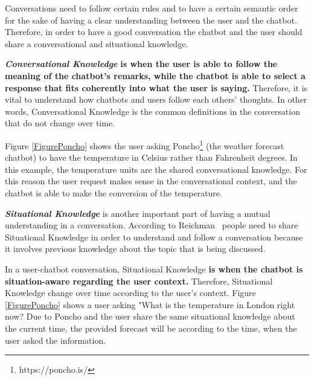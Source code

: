 \documentclass[a4paper,10pt]{article}
\begin{document}
Conversations need to follow certain rules and to have a certain semantic order for the sake of having a clear understanding between the user and the chatbot. Therefore, in order to have a good conversation the chatbot and the user should share a conversational and situational knowledge. 


\textbf{\textit{Conversational Knowledge}} \textbf{is when the user is able to follow the meaning of the chatbot's remarks, while the chatbot is able to select a response that fits coherently into what the user is saying.} Therefore, it is vital to understand how chatbots and users follow each others' thoughts. In other words, Conversational Knowledge is the common definitions in the conversation that do not change over time. 

Figure \ref{FigurePoncho} shows the user asking Poncho\footnote{https://poncho.is/} (the weather forecast chatbot) to have the temperature in Celsius rather than Fahrenheit degrees. In this example, the temperature units are the shared conversational knowledge. For this reason the user request makes sense in the conversational context, and the chatbot is able to make the conversion of the temperature.     


\textbf{\textit{Situational Knowledge}} is another important part of having a mutual understanding in a conversation. According to Reichman~\cite{reichman1985getting} people need to share Situational Knowledge in order to understand and follow a conversation because it involves previous knowledge about the topic that is being discussed.  

In a user-chatbot conversation, Situational Knowledge \textbf{is when the chatbot is situation-aware regarding the user context.} Therefore, Situational Knowledge change over time according to the user's context. Figure \ref{FigurePoncho} shows a user asking "What is the temperature in London right now? Due to Poncho and the user share the same situational knowledge about the current time, the provided forecast will be according to the time, when the user asked the information. 

\end{document}
